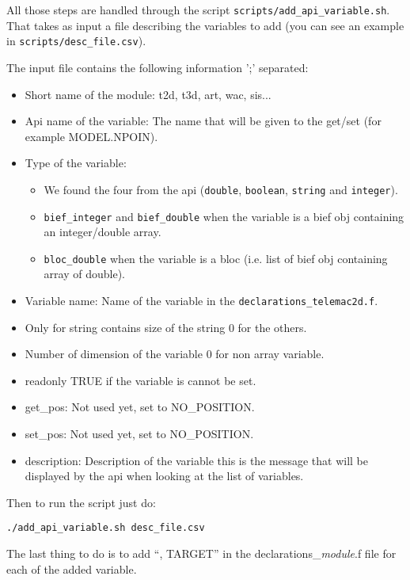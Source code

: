 All those steps are handled through the script
\verb!scripts/add_api_variable.sh!. That takes as input a file describing the
variables to add (you can see an example in \verb!scripts/desc_file.csv!).

The input file contains the following information ';' separated:
\begin{itemize}
  \item Short name of the module: t2d, t3d, art, wac, sis...
  \item Api name of the variable: The name that will be given to the get/set
    (for example MODEL.NPOIN).
  \item Type of the variable:
    \begin{itemize}
      \item We found the four from the api (\verb!double!, \verb!boolean!,
        \verb!string! and \verb!integer!).
      \item \verb!bief_integer! and \verb!bief_double! when the 
        variable is a bief obj containing an integer/double array.
      \item \verb!bloc_double! when the  variable is a bloc (i.e.
        list of bief obj containing array of double).
    \end{itemize}
  \item Variable \fortran name: Name of the variable in the
    \verb!declarations_telemac2d.f!.
  \item Only for string contains size of the string 0 for the others.
  \item Number of dimension of the variable 0 for non array variable.
  \item readonly TRUE if the variable is cannot be set.
  \item get\_pos: Not used yet, set to NO\_POSITION.
  \item set\_pos: Not used yet, set to NO\_POSITION.
  \item description: Description of the variable this is the message that will
    be displayed by the api when looking at the list of variables.
\end{itemize}

Then to run the script just do:
\begin{lstlisting}
./add_api_variable.sh desc_file.csv
\end{lstlisting}

The last thing to do is to add ``, TARGET'' in the
declarations\_\textit{module}.f file for each of the added variable.

